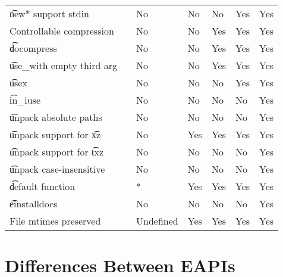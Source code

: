 \begin{landscape}
\begin{longtable}{llP{7.5em}P{7.5em}P{7.5em}P{7.5em}P{7.5em}}
\t{new*} support stdin &  &
    No & No & No & Yes & Yes \\

Controllable compression &  &
    No & No & Yes & Yes & Yes \\

\t{docompress} &  &
    No & No & Yes & Yes & Yes \\

\t{use\_with} empty third arg &  &
    No & No & Yes & Yes & Yes \\

\t{usex} &  &
    No & No & No & Yes & Yes \\

\t{in\_iuse} &  &
    No & No & No & No & Yes \\

\t{unpack} absolute paths &  &
    No & No & No & No & Yes \\

\t{unpack} support for \t{xz} &  &
    No & Yes & Yes & Yes & Yes \\

\t{unpack} support for \t{txz} &  &
    No & No & No & No & Yes \\

\t{unpack} case-insensitive &  &
    No & No & No & No & Yes \\

\t{default} function &  &
    * & Yes & Yes & Yes & Yes \\

\t{einstalldocs} &  &
    No & No & No & No & Yes \\

File mtimes preserved &  &
    Undefined & Yes & Yes & Yes & Yes \\

\end{longtable}
\end{landscape}

\chapter{Differences Between EAPIs}


